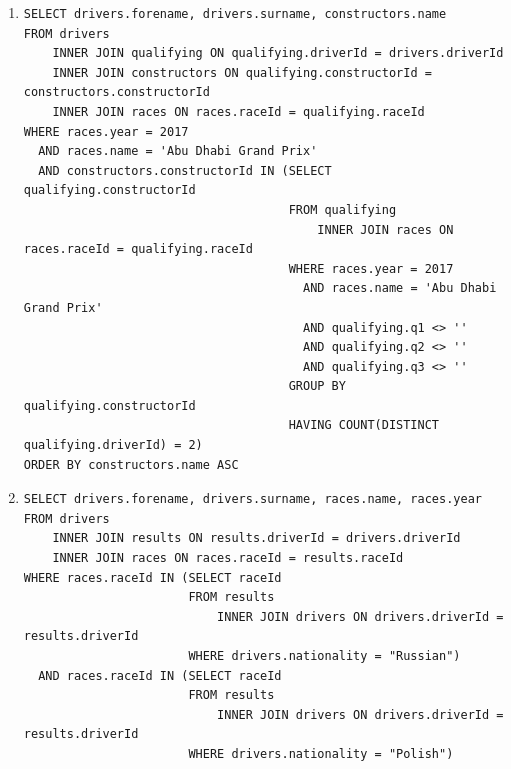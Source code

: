 \documentclass[a4paper]{article}
\begin{document}
\begin{enumerate}
    \item %
    \begin{verbatim}             
SELECT drivers.forename, drivers.surname, constructors.name
FROM drivers
	INNER JOIN qualifying ON qualifying.driverId = drivers.driverId
    INNER JOIN constructors ON qualifying.constructorId = constructors.constructorId
    INNER JOIN races ON races.raceId = qualifying.raceId
WHERE races.year = 2017
  AND races.name = 'Abu Dhabi Grand Prix'
  AND constructors.constructorId IN (SELECT qualifying.constructorId
									 FROM qualifying
								 		 INNER JOIN races ON races.raceId = qualifying.raceId
									 WHERE races.year = 2017
									   AND races.name = 'Abu Dhabi Grand Prix'
									   AND qualifying.q1 <> ''
                                       AND qualifying.q2 <> ''
                                       AND qualifying.q3 <> ''
									 GROUP BY qualifying.constructorId
									 HAVING COUNT(DISTINCT qualifying.driverId) = 2)
ORDER BY constructors.name ASC
    \end{verbatim}
    
    \item %
    \begin{verbatim}  
SELECT drivers.forename, drivers.surname, races.name, races.year
FROM drivers
	INNER JOIN results ON results.driverId = drivers.driverId
    INNER JOIN races ON races.raceId = results.raceId
WHERE races.raceId IN (SELECT raceId
					   FROM results 
                           INNER JOIN drivers ON drivers.driverId = results.driverId
					   WHERE drivers.nationality = "Russian")
  AND races.raceId IN (SELECT raceId
					   FROM results 
                           INNER JOIN drivers ON drivers.driverId = results.driverId
					   WHERE drivers.nationality = "Polish")
    \end{verbatim}
    

\end{enumerate}
\end{document}
